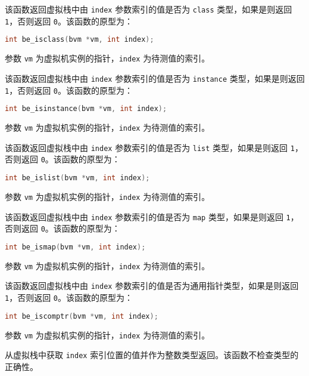 该函数返回虚拟栈中由 \texttt{index} 参数索引的值是否为 \texttt{class} 类型，如果是则返回 \texttt{1}，否则返回 \texttt{0}。该函数的原型为：
\begin{lstlisting}[language=c, style=berry, numbers=none]
int be_isclass(bvm *vm, int index);
\end{lstlisting}
参数 \texttt{vm} 为虚拟机实例的指针，\texttt{index} 为待测值的索引。


该函数返回虚拟栈中由 \texttt{index} 参数索引的值是否为 \texttt{instance} 类型，如果是则返回 \texttt{1}，否则返回 \texttt{0}。该函数的原型为：
\begin{lstlisting}[language=c, style=berry, numbers=none]
int be_isinstance(bvm *vm, int index);
\end{lstlisting}
参数 \texttt{vm} 为虚拟机实例的指针，\texttt{index} 为待测值的索引。


该函数返回虚拟栈中由 \texttt{index} 参数索引的值是否为 \texttt{list} 类型，如果是则返回 \texttt{1}，否则返回 \texttt{0}。该函数的原型为：
\begin{lstlisting}[language=c, style=berry, numbers=none]
int be_islist(bvm *vm, int index);
\end{lstlisting}
参数 \texttt{vm} 为虚拟机实例的指针，\texttt{index} 为待测值的索引。


该函数返回虚拟栈中由 \texttt{index} 参数索引的值是否为 \texttt{map} 类型，如果是则返回 \texttt{1}，否则返回 \texttt{0}。该函数的原型为：
\begin{lstlisting}[language=c, style=berry, numbers=none]
int be_ismap(bvm *vm, int index);
\end{lstlisting}
参数 \texttt{vm} 为虚拟机实例的指针，\texttt{index} 为待测值的索引。


该函数返回虚拟栈中由 \texttt{index} 参数索引的值是否为通用指针类型，如果是则返回 \texttt{1}，否则返回 \texttt{0}。该函数的原型为：
\begin{lstlisting}[language=c, style=berry, numbers=none]
int be_iscomptr(bvm *vm, int index);
\end{lstlisting}
参数 \texttt{vm} 为虚拟机实例的指针，\texttt{index} 为待测值的索引。


从虚拟栈中获取 \texttt{index} 索引位置的值并作为整数类型返回。该函数不检查类型的正确性。

